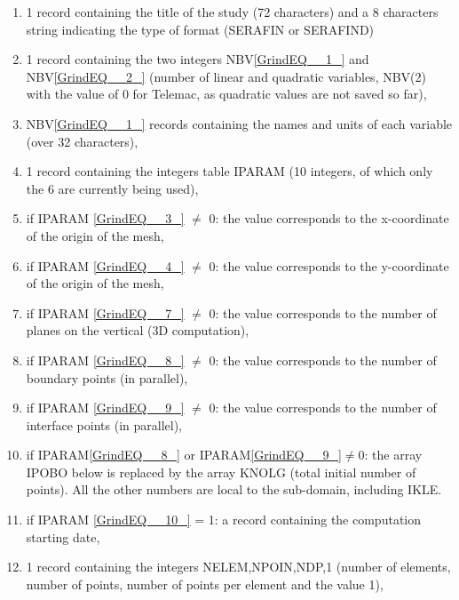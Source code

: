 \documentclass{article} %
\begin{document}
\begin{enumerate}
\item  1 record containing the title of the study (72 characters) and a 8 characters string indicating the type of format (SERAFIN or SERAFIND)

\item  1 record containing the two integers NBV\eqref{GrindEQ__1_} and NBV\eqref{GrindEQ__2_} (number of linear and quadratic variables, NBV(2) with the value of 0 for Telemac, as quadratic values are not saved so far),

\item  NBV\eqref{GrindEQ__1_} records containing the names and units of each variable (over 32 characters),

\item  1 record containing the integers table IPARAM (10 integers, of which only the 6 are currently being used),

\item  if IPARAM \eqref{GrindEQ__3_} $\neq$ 0: the value corresponds to the x-coordinate of the origin of the mesh,

\item  if IPARAM \eqref{GrindEQ__4_} $\neq$ 0: the value corresponds to the y-coordinate of the origin of the mesh,

\item  if IPARAM \eqref{GrindEQ__7_} $\neq$ 0: the value corresponds to the number of  planes on the vertical (3D computation),

\item  if IPARAM \eqref{GrindEQ__8_} $\neq$ 0: the value corresponds to the number of boundary points (in parallel),

\item  if IPARAM \eqref{GrindEQ__9_} $\neq$ 0: the value corresponds to the number of interface points (in parallel),

\item  if IPARAM\eqref{GrindEQ__8_} or IPARAM\eqref{GrindEQ__9_}$\neq$0: the array IPOBO below is replaced by the array KNOLG (total initial number of points). All the other numbers are local to the sub-domain, including IKLE.

\item  if IPARAM \eqref{GrindEQ__10_} = 1: a record containing the computation starting date,

\item  1 record containing the integers NELEM,NPOIN,NDP,1 (number of elements, number of points, number of points per element and the value 1),


\end{enumerate}
\end{document}
